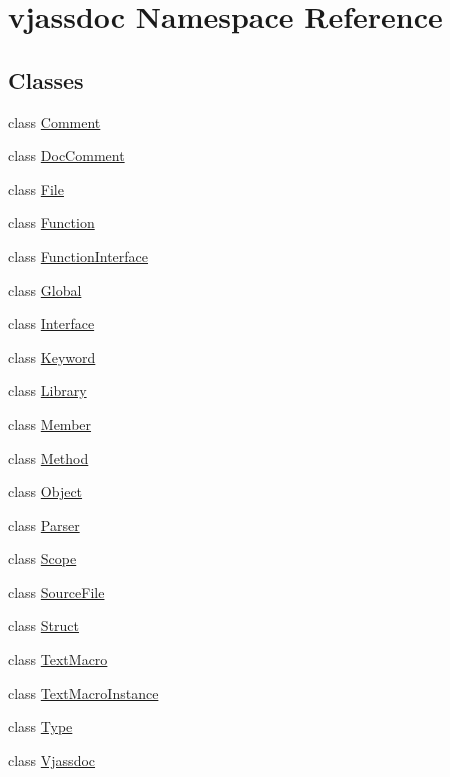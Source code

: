 \hypertarget{namespacevjassdoc}{
\section{vjassdoc Namespace Reference}
\label{namespacevjassdoc}
}


\subsection*{Classes}
\begin{CompactItemize}
\item 
class \hyperlink{classvjassdoc_1_1Comment}{Comment}
\item 
class \hyperlink{classvjassdoc_1_1DocComment}{DocComment}
\item 
class \hyperlink{classvjassdoc_1_1File}{File}
\item 
class \hyperlink{classvjassdoc_1_1Function}{Function}
\item 
class \hyperlink{classvjassdoc_1_1FunctionInterface}{FunctionInterface}
\item 
class \hyperlink{classvjassdoc_1_1Global}{Global}
\item 
class \hyperlink{classvjassdoc_1_1Interface}{Interface}
\item 
class \hyperlink{classvjassdoc_1_1Keyword}{Keyword}
\item 
class \hyperlink{classvjassdoc_1_1Library}{Library}
\item 
class \hyperlink{classvjassdoc_1_1Member}{Member}
\item 
class \hyperlink{classvjassdoc_1_1Method}{Method}
\item 
class \hyperlink{classvjassdoc_1_1Object}{Object}
\item 
class \hyperlink{classvjassdoc_1_1Parser}{Parser}
\item 
class \hyperlink{classvjassdoc_1_1Scope}{Scope}
\item 
class \hyperlink{classvjassdoc_1_1SourceFile}{SourceFile}
\item 
class \hyperlink{classvjassdoc_1_1Struct}{Struct}
\item 
class \hyperlink{classvjassdoc_1_1TextMacro}{TextMacro}
\item 
class \hyperlink{classvjassdoc_1_1TextMacroInstance}{TextMacroInstance}
\item 
class \hyperlink{classvjassdoc_1_1Type}{Type}
\item 
class \hyperlink{classvjassdoc_1_1Vjassdoc}{Vjassdoc}
\end{CompactItemize}
